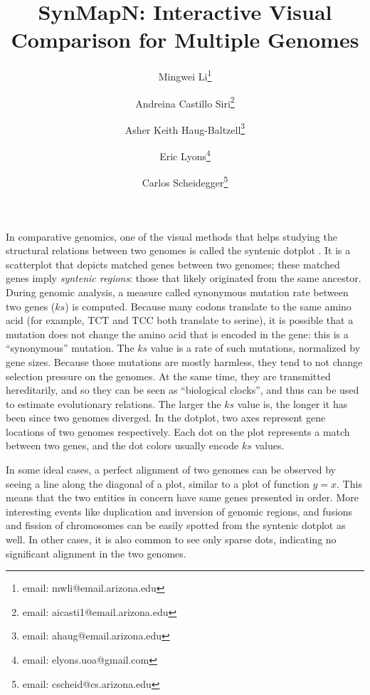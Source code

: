 \documentclass{vgtc}                      %
\title{SynMapN: Interactive Visual Comparison for Multiple Genomes}
\author{
Mingwei Li\thanks{email: mwli@email.arizona.edu}
\and Andreina Castillo Siri\thanks{email: aicasti1@email.arizona.edu}
\and Asher Keith Haug-Baltzell\thanks{email: ahaug@email.arizona.edu}
\and Eric Lyons\thanks{email: elyons.uoa@gmail.com}
\and Carlos Scheidegger\thanks{email: cscheid@cs.arizona.edu}
}
\affiliation{\scriptsize University of Arizona}
\begin{document}
\maketitle
In comparative genomics, one of the visual methods that helps studying the structural relations between two genomes is called the syntenic dotplot \cite{syntenic_dotplot, synmap}.
It is a scatterplot that depicts matched genes between two genomes; these matched genes imply \emph{syntenic regions}: those that likely originated from the same ancestor.
During genomic analysis, a measure called synonymous mutation rate between two genes ($ks$) is computed.
Because many codons translate to the same amino acid (for example, TCT and TCC both translate to serine), it is possible that a mutation does not change the amino acid that is encoded in the gene: this is a ``synonymous'' mutation.
The $ks$ value is a rate of such mutations, normalized by gene sizes. Because those mutations are mostly harmless, they tend to not change selection pressure on the genomes. At the same time, they are transmitted hereditarily, and so they can be seen as ``biological clocks'', and thus can be used to estimate evolutionary relations.
The larger the $ks$ value is, the longer it has been since two genomes diverged.
In the dotplot, two axes represent gene locations of two genomes respectively. Each dot on the plot represents a match between two genes, and the dot colors usually encode $ks$ values.

In some ideal cases, a perfect alignment of two genomes can be observed by seeing a line along the diagonal of a plot, similar to a plot of function $y=x$. This means that the two entities in concern have same genes presented in order. More interesting events like duplication and inversion of genomic regions, and fusions and fission of chromosomes can be easily spotted from the syntenic dotplot as well. In other cases, it is also common to see only sparse dots, indicating no significant alignment in the two genomes.
\end{document}
